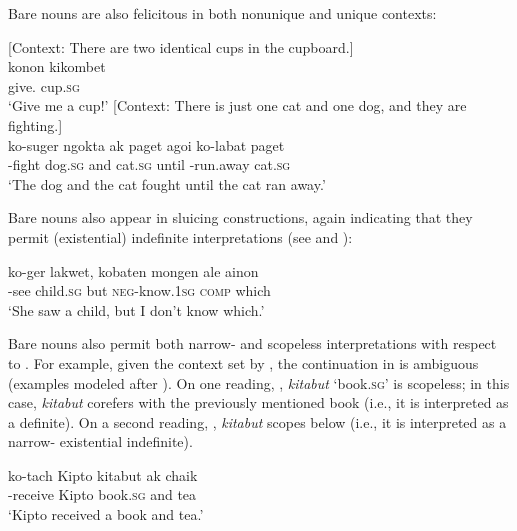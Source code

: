 \documentclass[output=paper,newtxmath,modfonts,nonflat,hidelinks]{langsci/langscibook}
\begin{document}
\noindent Bare nouns are also felicitous in both nonunique and unique contexts:

\ea \label{ex:landman:uniqueness}
\settowidth{}  
  \ea \label{ex:landman:nonunique} [Context: There are two identical cups in the cupboard.]\\
    \gll konon kikombet \\
         give.{\IMP} cup.\textsc{sg} \\ 
    \glt ‘Give me a cup!’
    \ex \label{ex:landman:unique} [Context: There is just one cat and one dog, and they are fighting.]\\ 
    \gll 
      ko-suger ngokta ak paget agoi ko-labat paget\\
      {\PST}-fight dog.\textsc{sg} and cat.\textsc{sg} until {\PST}-run.away cat.\textsc{sg}\\ 
    \glt ‘The dog and the cat fought until the cat ran away.’
  \z
\z 

Bare nouns also appear in sluicing constructions, again indicating that they permit (existential) indefinite interpretations (see \citealt{Chung:1995} and \citealt{Reinhart:1997}):

\ea \label{ex:landman:sluicing}
  \gll ko-ger lakwet, kobaten mongen ale ainon\\	
	   {\PST}-see child.\textsc{sg} but \textsc{neg}-know.1\textsc{sg} \textsc{comp} which\\
  \glt ‘She saw a child, but I don't know which.’
\z 

Bare nouns also permit both narrow- and scopeless interpretations with respect to . For example, given the context set by , the continuation in  is ambiguous (examples modeled after \citealt{Matthewson:2001}). On one reading, , \textit{kitabut} ‘book.\textsc{sg}’ is scopeless; in this case, \textit{kitabut} corefers with the previously mentioned book (i.e., it is interpreted as a definite). On a second reading, , \textit{kitabut} scopes below  (i.e., it is interpreted as a narrow- existential indefinite). 

\ea \label{ex:landman:context}
  \gll ko-tach Kipto kitabut ak chaik\\	
	   {\PST}-receive Kipto book.\textsc{sg} and tea\\
\glt ‘Kipto received a book and tea.’
\z 
   
\end{document}
